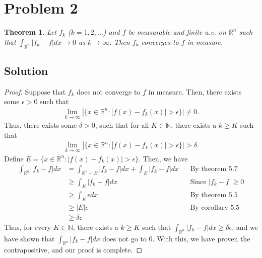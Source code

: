 \documentclass[10pt,a4paper]{article}
\theoremstyle{theorem}
\newtheorem{theorem}{Theorem}
\theoremstyle{definition}
\begin{document}
\section*{Problem 2}
\begin{theorem}
Let $f_k$ ($k = 1,2,...$) and $f$ be measurable and finite a.e. on $\mathbb{R}^n$ such that $\int_{\mathbb{R}^n} |f_k - f| dx \to 0$ as $k \to \infty$. Then $f_k$ converges to $f$ in measure.
\end{theorem}

\subsection*{Solution}
\begin{proof}
Suppose that $f_k$ does not converge to $f$ in measure. Then, there exists some $\epsilon > 0$ such that 
\begin{align*}
\lim_{k \to \infty} |\{x \in \mathbb{R}^n : |f(x) - f_k(x)| > \epsilon\}| \not= 0.
\end{align*}
Thus, there exists some $\delta > 0$, such that for all $K \in \mathbb{N}$, there exists a $k \geq K$ such that 
\begin{align*}
\lim_{k \to \infty} |\{x \in \mathbb{R}^n : |f(x) - f_k(x)| > \epsilon\}| > \delta.
\end{align*}
Define $E = \{x \in \mathbb{R}^n : |f(x) - f_k(x)| > \epsilon\}$. Then, we have
\begin{align*}
\int_{\mathbb{R}^n} |f_k - f| dx &= \int_{\mathbb{R}^n - E} |f_k - f| dx + \int_{E} |f_k - f| dx && \text{By theorem 5.7}\\
&\geq \int_{E} |f_k - f| dx &&\text{Since } |f_k - f| \geq 0\\
&\geq \int_{E} \epsilon dx && \text{By theorem 5.5}\\
&\geq |E| \epsilon &&\text{By corollary 5.5}\\
&\geq \delta \epsilon
\end{align*}
Thus, for every $K \in \mathbb{N}$, there exists a $k \geq K$ such that $\int_{\mathbb{R}^n} |f_k - f| dx \geq \delta \epsilon$, and we have shown that $\int_{\mathbb{R}^n} |f_k - f| dx$ does not go to $0$. With this, we have proven the contrapositive, and our proof is complete.
\end{proof}
\end{document}
